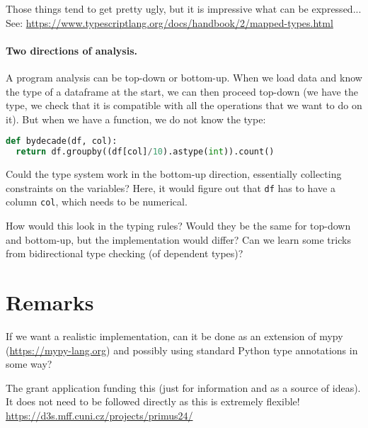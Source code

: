 \documentclass{article}
\begin{document}
Those things tend to get pretty ugly, but it is impressive what can be expressed...
See: \url{https://www.typescriptlang.org/docs/handbook/2/mapped-types.html}

\paragraph{Two directions of analysis.}
A program analysis can be top-down or bottom-up. When we load data and know the type of a dataframe at the start, we can then proceed top-down (we have the type, we check that it is compatible with all the operations that we want to do on it). But when we have a function, we do not know the type:

\begin{lstlisting}[language=Python]
def bydecade(df, col):
  return df.groupby((df[col]/10).astype(int)).count()
\end{lstlisting}

Could the type system work in the bottom-up direction, essentially collecting constraints on the variables? Here, it would figure out that \texttt{df} has to have a column \texttt{col}, which needs to be numerical.

How would this look in the typing rules? Would they be the same for top-down and bottom-up, but the implementation would differ? Can we learn some tricks from bidirectional type checking (of dependent types)?

\section{Remarks}
If we want a realistic implementation, can it be done as an extension of mypy (\url{https://mypy-lang.org}) and possibly using standard Python type annotations in some way?

The grant application funding this (just for information and as a source of ideas). It does not need to be followed directly as this is extremely flexible! \url{https://d3s.mff.cuni.cz/projects/primus24/}
\end{document}
